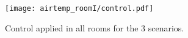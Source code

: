 \documentclass{ifacconf}  %
\begin{document}
\begin{figure}[h]
  \centering
 \texttt{[image: airtemp\_roomI/control.pdf]}
  \caption{Control applied in all rooms for the 3 scenarios.}\label{fig:control_3Scenarios}
\end{figure}


% 
\end{document}
